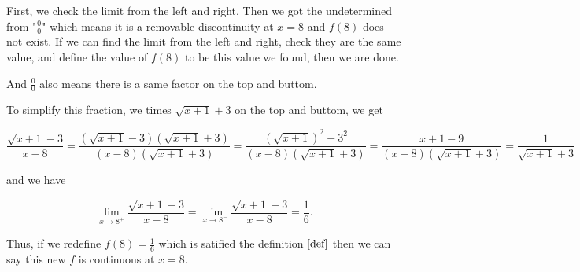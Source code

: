 \documentclass[12pt]{article}
\begin{document}
First, we check the limit from the left and right. Then we got the undetermined from "$\frac{0}{0}$"
which means it is a removable discontinuity at $x=8$ and $f(8)$ does not exist.
If we can find the limit from the left and right, check they are the same value, and
define the value of $f(8)$ to be this value we found, then we are done.

And $\frac{0}{0}$ also means there is a same factor on the top and buttom. 

To simplify this fraction, we times $\sqrt{x+1}+3$ on the top and buttom, we get

$$\frac{\sqrt{x+1}-3}{x-8}=\frac{(\sqrt{x+1}-3)(\sqrt{x+1}+3)}{(x-8)(\sqrt{x+1}+3)}=
\frac{(\sqrt{x+1})^2 -3^2}{(x-8)(\sqrt{x+1}+3)}=\frac{x+1-9}{(x-8)(\sqrt{x+1}+3)}=\frac{1}{\sqrt{x+1}+3}$$

and we have 

$$\lim_{x \to 8^+}\frac{\sqrt{x+1}-3}{x-8}=\lim_{x \to 8^-}\frac{\sqrt{x+1}-3}{x-8}=\frac{1}{6}.$$

Thus, if we redefine $f(8)=\frac{1}{6}$ which is satified the definition $\eqref{def}$ then
we can say this new $f$ is continuous at $x=8$.
\end{document}
